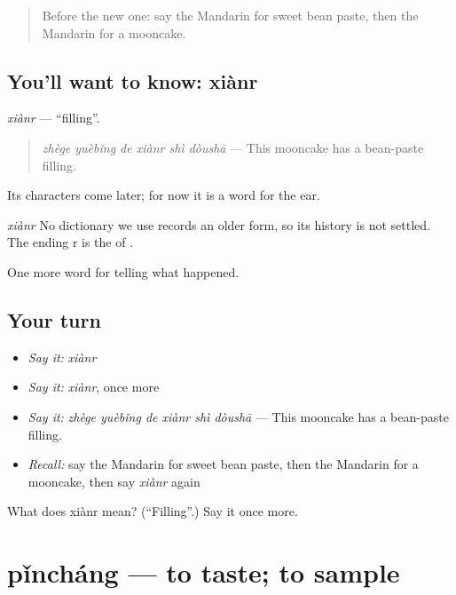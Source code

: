 \begin{quote}
Before the new one: say the Mandarin for sweet bean paste, then the Mandarin for a mooncake.
\end{quote}

\subsection*{You'll want to know: xiànr}
\emph{xiànr} — \textquotedblleft{}filling\textquotedblright{}.

\begin{quote}
\emph{zhège yuèbǐng de xiànr shì dòushā} — This mooncake has a bean-paste filling.
\end{quote}

Its characters come later; for now it is a word for the ear.

\begin{cousinweb}
\emph{xiànr} No dictionary we use records an older form, so its history is not settled. The ending r is the  of .
\end{cousinweb}

\begin{grammarlens}[title={What you've built}]
One more word for telling what happened.
\end{grammarlens}

\subsection*{Your turn}
\begin{itemize}
\raggedright
  \item \emph{Say it:} \emph{xiànr}
  \item \emph{Say it:} \emph{xiànr}, once more
  \item \emph{Say it:} \emph{zhège yuèbǐng de xiànr shì dòushā} — This mooncake has a bean-paste filling.
  \item \emph{Recall:} say the Mandarin for sweet bean paste, then the Mandarin for a mooncake, then say \emph{xiànr} again
\end{itemize}

\begin{tcolorbox}[breakable,colback=teal!4,colframe=teal!35!black,title={Before you move on}]
What does xiànr mean? (\textquotedblleft{}Filling\textquotedblright{}.) Say it once more.
\end{tcolorbox}
\section[pǐncháng]{pǐncháng — to taste; to sample}

